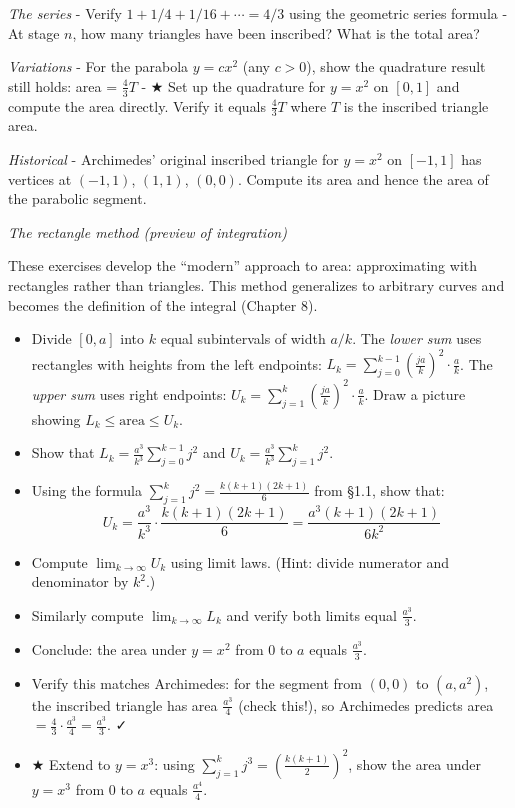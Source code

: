 \documentclass[
  10pt,
  letterpaper,
]{scrbook}
\begin{document}
\emph{The series} - Verify \(1 + 1/4 + 1/16 + \cdots = 4/3\) using the
geometric series formula - At stage \(n\), how many triangles have been
inscribed? What is the total area?

\emph{Variations} - For the parabola \(y = cx^2\) (any \(c > 0\)), show
the quadrature result still holds: area = \(\frac{4}{3}T\) - ★ Set up
the quadrature for \(y = x^2\) on \([0, 1]\) and compute the area
directly. Verify it equals \(\frac{4}{3}T\) where \(T\) is the inscribed
triangle area.

\emph{Historical} - Archimedes' original inscribed triangle for
\(y = x^2\) on \([-1, 1]\) has vertices at \((-1, 1)\), \((1, 1)\),
\((0, 0)\). Compute its area and hence the area of the parabolic
segment.

\emph{The rectangle method (preview of integration)}

These exercises develop the ``modern'' approach to area: approximating
with rectangles rather than triangles. This method generalizes to
arbitrary curves and becomes the definition of the integral (Chapter 8).

\begin{itemize}
\item
  Divide \([0, a]\) into \(k\) equal subintervals of width \(a/k\). The
  \emph{lower sum} uses rectangles with heights from the left endpoints:
  \(L_k = \sum_{j=0}^{k-1} \left(\frac{ja}{k}\right)^2 \cdot \frac{a}{k}\).
  The \emph{upper sum} uses right endpoints:
  \(U_k = \sum_{j=1}^{k} \left(\frac{ja}{k}\right)^2 \cdot \frac{a}{k}\).
  Draw a picture showing \(L_k \leq \text{area} \leq U_k\).
\item
  Show that \(L_k = \frac{a^3}{k^3} \sum_{j=0}^{k-1} j^2\) and
  \(U_k = \frac{a^3}{k^3} \sum_{j=1}^{k} j^2\).
\item
  Using the formula \(\sum_{j=1}^{k} j^2 = \frac{k(k+1)(2k+1)}{6}\) from
  §1.1, show that:
  \[U_k = \frac{a^3}{k^3} \cdot \frac{k(k+1)(2k+1)}{6} = \frac{a^3(k+1)(2k+1)}{6k^2}\]
\item
  Compute \(\lim_{k \to \infty} U_k\) using limit laws. (Hint: divide
  numerator and denominator by \(k^2\).)
\item
  Similarly compute \(\lim_{k \to \infty} L_k\) and verify both limits
  equal \(\frac{a^3}{3}\).
\item
  Conclude: the area under \(y = x^2\) from \(0\) to \(a\) equals
  \(\frac{a^3}{3}\).
\item
  Verify this matches Archimedes: for the segment from \((0,0)\) to
  \((a, a^2)\), the inscribed triangle has area \(\frac{a^3}{4}\) (check
  this!), so Archimedes predicts area
  \(= \frac{4}{3} \cdot \frac{a^3}{4} = \frac{a^3}{3}\). ✓
\item
  ★ Extend to \(y = x^3\): using
  \(\sum_{j=1}^{k} j^3 = \left(\frac{k(k+1)}{2}\right)^2\), show the
  area under \(y = x^3\) from \(0\) to \(a\) equals \(\frac{a^4}{4}\).
\end{itemize}
\end{document}
